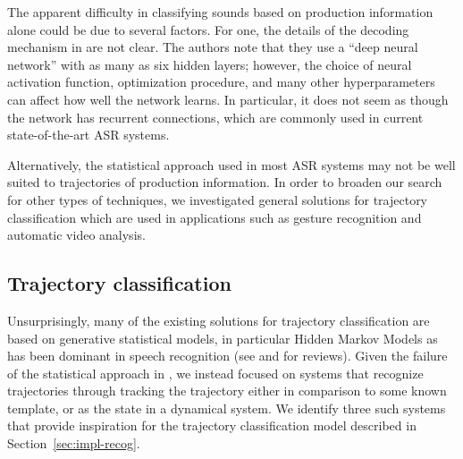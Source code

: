 The apparent difficulty
in classifying sounds based on
production information alone
could be due to several factors.
For one, the details of the decoding mechanism
in \citet{mitra2014} are not clear.
The authors note that they use a
``deep neural network''
with as many as six hidden layers;
however, the choice of neural activation function,
optimization procedure,
and many other hyperparameters
can affect how well the network learns.
In particular, it does not seem as though
the network has recurrent connections,
which are commonly used in
current state-of-the-art ASR systems.

Alternatively, the statistical approach
used in most ASR systems
may not be well suited to
trajectories of production information.
In order to broaden our search
for other types of techniques,
we investigated general solutions
for trajectory classification
which are used in applications
such as gesture recognition
and automatic video analysis.

\subsection{Trajectory classification}
\label{sec:prev-classification}


Unsurprisingly, many of the existing
solutions for trajectory classification
are based on generative statistical models,
in particular Hidden Markov Models
as has been dominant in speech recognition
(see \citealt{mlich2008,nascimento2010}
and \citealt{mitra2007,weinland2011,rautaray2015}
for reviews).
Given the failure of the statistical approach
in \citet{mitra2014},
we instead focused on systems
that recognize trajectories
through tracking the trajectory
either in comparison to some known template,
or as the state in a dynamical system.
We identify three such systems
that provide inspiration
for the trajectory classification model
described in Section~\ref{sec:impl-recog}.

